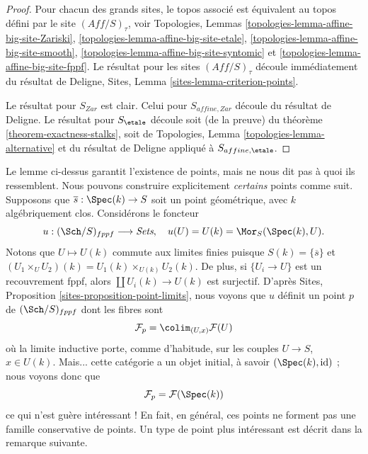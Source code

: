 \begin{proof}
Pour chacun des grands sites, le topos associ\'e est \'equivalent au
topos d\'efini par le site $(\textit{Aff}/S)_\tau$, voir
Topologies, Lemmas \ref{topologies-lemma-affine-big-site-Zariski},
\ref{topologies-lemma-affine-big-site-etale},
\ref{topologies-lemma-affine-big-site-smooth},
\ref{topologies-lemma-affine-big-site-syntomic} et
\ref{topologies-lemma-affine-big-site-fppf}.
Le r\'esultat pour les sites $(\textit{Aff}/S)_\tau$ d\'ecoule imm\'ediatement
du r\'esultat de Deligne,
Sites, Lemma \ref{sites-lemma-criterion-points}.

\medskip\noindent
Le r\'esultat pour $S_{Zar}$ est clair. Celui pour $S_{affine, Zar}$
d\'ecoule du r\'esultat de Deligne. Le r\'esultat pour $S_\etale$
d\'ecoule soit (de la preuve) du
th\'eor\`eme \ref{theorem-exactness-stalks},
soit de Topologies, Lemma \ref{topologies-lemma-alternative}
et du r\'esultat de Deligne appliqu\'e \`a $S_{affine, \etale}$.
\end{proof}

\noindent
Le lemme ci-dessus garantit l'existence de points, mais ne nous
dit pas \`a quoi ils ressemblent. Nous pouvons construire explicitement
{\it certains} points comme suit.
Supposons que $\overline{s} : \Spec(k) \to S$ soit un point
g\'eom\'etrique, avec $k$ alg\'ebriquement clos. Consid\'erons le foncteur
$$
u : (\Sch/S)_{fppf} \longrightarrow \textit{Sets},
\quad
u(U) = U(k) = \Mor_S(\Spec(k), U).
$$
Notons que $U \mapsto U(k)$ commute aux limites finies puisque
$S(k) = \{\overline{s}\}$ et
$(U_1 \times_U U_2)(k) = U_1(k) \times_{U(k)} U_2(k)$.
De plus, si $\{U_i \to U\}$ est un recouvrement fppf, alors
$\coprod U_i(k) \to U(k)$ est surjectif.
D'apr\`es
Sites, Proposition \ref{sites-proposition-point-limits},
nous voyons que $u$ d\'efinit un point $p$ de $(\Sch/S)_{fppf}$ dont les
fibres sont
$$
\mathcal{F}_p = \colim_{(U, x)} \mathcal{F}(U)
$$
o\`u la limite inductive porte, comme d'habitude, sur les couples $U \to S$, $x \in U(k)$.
Mais... cette cat\'egorie a un objet initial, \`a savoir
$(\Spec(k), \text{id})$ ; nous voyons donc que
$$
\mathcal{F}_p = \mathcal{F}(\Spec(k))
$$
ce qui n'est gu\`ere int\'eressant ! En fait, en g\'en\'eral, ces points ne
forment pas une famille conservative de points. Un type de point plus int\'eressant
est d\'ecrit dans la remarque suivante.

